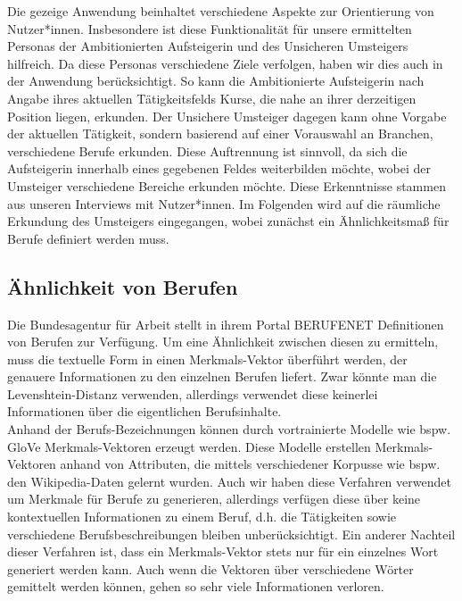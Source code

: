 \documentclass[10pt]{article}
\begin{document}
Die gezeige Anwendung beinhaltet verschiedene Aspekte zur Orientierung von
Nutzer*innen. Insbesondere ist diese Funktionalität für unsere ermittelten
Personas der Ambitionierten Aufsteigerin und des Unsicheren Umsteigers
hilfreich. Da diese Personas verschiedene Ziele verfolgen, haben wir dies 
auch in der Anwendung berücksichtigt. So kann die Ambitionierte Aufsteigerin 
nach Angabe ihres aktuellen Tätigkeitsfelds Kurse, die nahe an ihrer 
derzeitigen Position liegen, erkunden. Der Unsichere Umsteiger dagegen kann 
ohne Vorgabe der aktuellen Tätigkeit, sondern basierend auf einer Vorauswahl 
an Branchen, verschiedene Berufe erkunden. Diese Auftrennung ist sinnvoll, 
da sich die Aufsteigerin innerhalb eines gegebenen Feldes weiterbilden 
möchte, wobei der Umsteiger verschiedene Bereiche erkunden möchte. Diese 
Erkenntnisse stammen aus unseren Interviews mit Nutzer*innen. Im Folgenden 
wird auf die räumliche Erkundung des Umsteigers eingegangen, wobei zunächst 
ein Ähnlichkeitsmaß für Berufe definiert werden muss.

\subsection{Ähnlichkeit von Berufen}

Die Bundesagentur für Arbeit stellt in ihrem Portal BERUFENET Definitionen von
Berufen zur Verfügung. Um eine Ähnlichkeit zwischen diesen zu ermitteln, muss
die textuelle Form in einen Merkmals-Vektor überführt werden, der genauere
Informationen zu den einzelnen Berufen liefert. Zwar könnte man die
Levenshtein-Distanz verwenden, allerdings verwendet diese keinerlei
Informationen über die eigentlichen Berufsinhalte.\\

 Anhand der Berufs-Bezeichnungen können durch vortrainierte Modelle wie bspw.
 GloVe Merkmals-Vektoren erzeugt werden. Diese Modelle erstellen 
 Merkmals-Vektoren anhand von Attributen, die mittels verschiedener
 Korpusse wie bspw. den Wikipedia-Daten gelernt wurden. Auch wir haben diese
 Verfahren verwendet um Merkmale für Berufe zu generieren, allerdings verfügen
 diese über keine kontextuellen Informationen zu einem Beruf, d.h. die
 Tätigkeiten sowie verschiedene Berufsbeschreibungen bleiben unberücksichtigt.
 Ein anderer Nachteil dieser Verfahren ist, dass ein Merkmals-Vektor stets nur
 für ein einzelnes Wort generiert werden kann. Auch wenn die Vektoren über
 verschiedene Wörter gemittelt werden können, gehen so sehr viele 
 Informationen verloren.\\
\end{document}
